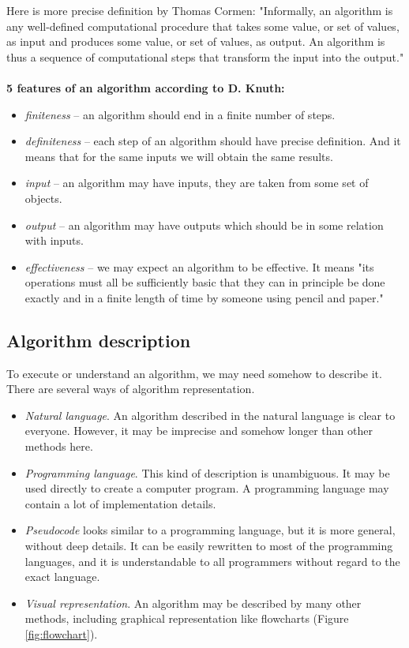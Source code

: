 \documentclass[
  field=inf,
  biblatex,
  language=english,
  glossaries,
  theorems=false,
  sourcecodes=false,
  index
]{kidiplom}
\begin{document}
Here is more precise definition by Thomas Cormen: "Informally, an algorithm is any well-defined computational procedure that takes some value, or set of values, as input and produces some value, or set of values, as output. An algorithm is thus a sequence of computational steps that transform the input into the output." \cite{cormen}
\\\\
\textbf{5 features of an algorithm according to D. Knuth\cite{knuth1}:}
\begin{itemize}
	\item \textit{finiteness} -- an algorithm should end in a finite number of steps.
	\item \textit{definiteness} -- each step of an algorithm should have precise definition. And it means that for the same inputs we will obtain the same results.
	\item \textit{input} -- an algorithm may have inputs, they are taken from some set of objects.
	\item \textit{output} -- an algorithm may have outputs which should be in some relation with inputs.
	\item \textit{effectiveness} -- we may expect an algorithm to be effective. It means "its operations must all be sufficiently basic that they can in principle be done exactly and in a finite length of time by someone using pencil and paper."\cite{knuth1}
\end{itemize}

\subsection{Algorithm description}

To execute or understand an algorithm, we may need somehow to describe it. There are several ways of algorithm representation.

\begin{itemize}
	\item \textit{Natural language}. An algorithm described in the natural language is clear to everyone. However, it may be imprecise and somehow longer than other methods here.
	\item \textit{Programming language}. This kind of description is unambiguous. It may be used directly to create a computer program. A programming language may contain a lot of implementation details.
	\item \textit{Pseudocode} looks similar to a programming language, but it is more general, without deep details. It can be easily rewritten to most of the programming languages, and it is understandable to all programmers without regard to the exact language.
	\item \textit{Visual representation}. An algorithm may be described by many other methods, including graphical representation like flowcharts (Figure \ref{fig:flowchart}).
\end{itemize}
\end{document}
